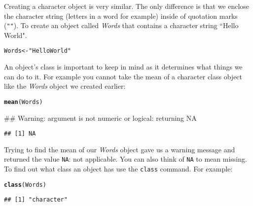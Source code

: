 \documentclass[ChapterTOCs,krantz1]{krantz}\usepackage{graphicx, color}
\makeatletter
\newcommand{\hlfunctioncall}[1]{\textcolor[rgb]{0.501960784313725,0,0.329411764705882}{\textbf{#1}}}%
\newcommand{\hlstring}[1]{\textcolor[rgb]{0.6,0.6,1}{#1}}%
\newenvironment{kframe}{%
 \def\at@end@of@kframe{}%
 \ifinner\ifhmode%
  \def\at@end@of@kframe{\end{minipage}}%
  \begin{minipage}{\columnwidth}%
 \fi\fi%
 \def\FrameCommand##1{\hskip\@totalleftmargin \hskip-\fboxsep
 \colorbox{shadecolor}{##1}\hskip-\fboxsep
     \hskip-\linewidth \hskip-\@totalleftmargin \hskip\columnwidth}%
 \MakeFramed {\advance\hsize-\width
   \@totalleftmargin\z@ \linewidth\hsize
   \@setminipage}}%
 {\par\unskip\endMakeFramed%
 \at@end@of@kframe}
\newenvironment{knitrout}{}{} %
\makeatother
\begin{document}
\noindent Creating a character object is very similar. The only difference is that we enclose the character string (letters in a word for example) inside of quotation marks ({\tt{""}}). To create an object called {\emph{Words}} that contains a character string ``Hello World".

\begin{knitrout}
\color{fgcolor}\begin{kframe}
\begin{alltt}
Words <- \hlstring{"Hello World"}
\end{alltt}
\end{kframe}
\end{knitrout}



An object's class is important to keep in mind as it determines what things we can do to it. For example you cannot take the mean of a character class object like the {\emph{Words}} object we created earlier:

\begin{knitrout}
\color{fgcolor}\begin{kframe}
\begin{alltt}
\hlfunctioncall{mean}(Words)
\end{alltt}


{\ttfamily\noindent\textcolor{warningcolor}{\#\# Warning: argument is not numeric or logical: returning NA}}\begin{verbatim}
## [1] NA
\end{verbatim}
\end{kframe}
\end{knitrout}


\noindent Trying to find the mean of our {\emph{Words}} object gave us a warning message and returned the value {\tt{NA}}: not applicable. You can also think of {\tt{NA}} to mean missing. To find out what class an object has use the {\tt{class}} command. For example:

\begin{knitrout}
\color{fgcolor}\begin{kframe}
\begin{alltt}
\hlfunctioncall{class}(Words)
\end{alltt}
\begin{verbatim}
## [1] "character"
\end{verbatim}
\end{kframe}
\end{knitrout}
\end{document}
